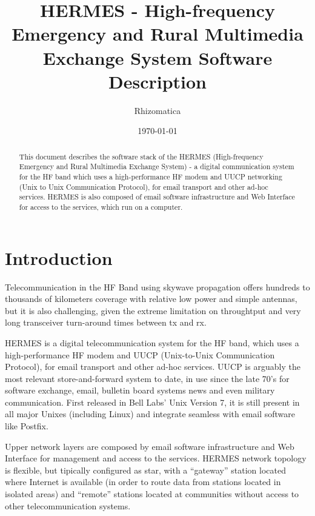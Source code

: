 \documentclass[11pt,a4paper]{article}
\title{HERMES - High-frequency Emergency and Rural Multimedia Exchange
  System Software Description}
\author{
       \large
        \mbox{Rhizomatica} \\ %
}
\date{\today}
\begin{document}
\maketitle

\begin{abstract}

This document describes the software stack of the HERMES (High-frequency Emergency and Rural Multimedia Exchange System)
- a digital communication system for the HF band which uses a
high-performance HF modem and UUCP networking (Unix to Unix
Communication Protocol), for email transport and other ad-hoc
services. HERMES is also composed of email software infrastructure and
Web Interface for access to the services, which run on a computer.

\end{abstract}

\newpage

\tableofcontents

\section{Introduction}

  Telecommunication in the HF Band using skywave propagation offers hundreds to thousands
  of kilometers coverage with relative low power and simple antennas, but it is also challenging,
  given the extreme limitation on throughtput  and very long transceiver turn-around times between tx and rx.

  HERMES is a digital telecommunication system for the HF band, which uses a high-performance HF modem and UUCP
  (Unix-to-Unix Communication Protocol), for email transport and other ad-hoc services.
  UUCP is arguably the most relevant store-and-forward system to date, in use since the late 70's
  for software exchange, email, bulletin board systems  news and even military communication. First released
  in Bell Labs' Unix Version 7, it is still present in all major Unixes (including Linux) and integrate seamless
  with email software like Postfix.

  Upper network layers are composed by email software infrastructure and Web Interface for management and access to the services.
  HERMES network topology is flexible, but tipically configured as star, with a ``gateway'' station located where Internet is available
  (in order to route data from stations located in isolated areas) and ``remote'' stations located at communities without access to
  other telecommunication systems.
\end{document}
